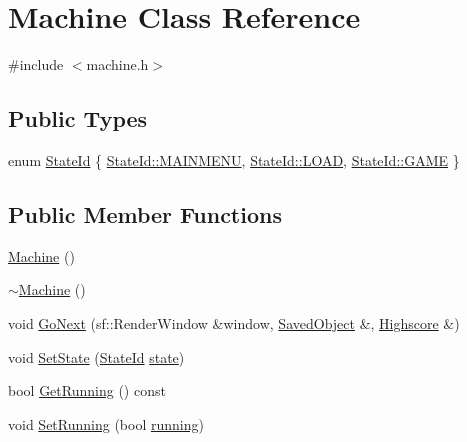 \hypertarget{classMachine}{}\section{Machine Class Reference}
\label{classMachine}


{\ttfamily \#include $<$machine.\+h$>$}

\subsection*{Public Types}
\begin{DoxyCompactItemize}
\item 
enum \hyperlink{classMachine_a5fb0c119d231dd1bfe1dd2c9ca533520}{State\+Id} \{ \hyperlink{classMachine_a5fb0c119d231dd1bfe1dd2c9ca533520a3287971e79b4dca11067ed287847c1e6}{State\+Id\+::\+M\+A\+I\+N\+M\+E\+NU}, 
\hyperlink{classMachine_a5fb0c119d231dd1bfe1dd2c9ca533520a615d2885ef7576cedd9aafbb2578f028}{State\+Id\+::\+L\+O\+AD}, 
\hyperlink{classMachine_a5fb0c119d231dd1bfe1dd2c9ca533520a4504e1ed59cd9732b8a844e5424e6f13}{State\+Id\+::\+G\+A\+ME}
 \}
\end{DoxyCompactItemize}
\subsection*{Public Member Functions}
\begin{DoxyCompactItemize}
\item 
\hyperlink{classMachine_a99427b767b7c15ceb33e391166cd7d68}{Machine} ()
\item 
\hyperlink{classMachine_a7f595e09b54761f6c1e73b192067bd9c}{$\sim$\+Machine} ()
\item 
void \hyperlink{classMachine_a9f3475798776d0e9bb42a14dec204292}{Go\+Next} (sf\+::\+Render\+Window \&window, \hyperlink{classSavedObject}{Saved\+Object} \&, \hyperlink{classHighscore}{Highscore} \&)
\item 
void \hyperlink{classMachine_abe967397f2de76335bd90ab7aabd8f9f}{Set\+State} (\hyperlink{classMachine_a5fb0c119d231dd1bfe1dd2c9ca533520}{State\+Id} \hyperlink{classMachine_a76e105e6a1e86eb11af49ca4c9a9ead9}{state})
\item 
bool \hyperlink{classMachine_aea08caf7a90b58c29efe1c243a1683a6}{Get\+Running} () const 
\item 
void \hyperlink{classMachine_a5db8f7c8abac6d9ea950676917e98a80}{Set\+Running} (bool \hyperlink{classMachine_aaf4949e30c3e33602e4082c9739d3e37}{running})
\end{DoxyCompactItemize}
